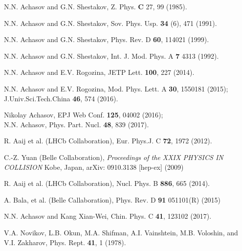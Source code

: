 \documentclass[aps,preprint,groupedaddress,floatfix]{revtex4}
\begin{document}
\begin{thebibliography}{99}
 N.N. Achasov and G.N. Shestakov,  Z. Phys. {\bf C} 27, 99 (1985).

 N.N. Achasov and G.N. Shestakov,  Sov. Phys. Usp. {\bf 34} (6), 471  (1991).

 N.N. Achasov and G.N. Shestakov, Phys. Rev. D {\bf 60}, 114021
 (1999).

N.N. Achasov and G.N. Shestakov, Int. J. Mod. Phys. A {\bf 7} 4313
(1992).

 N.N. Achasov and E.V. Rogozina, JETP Lett. {\bf 100}, 227 (2014).

N.N. Achasov and E.V. Rogozina, Mod. Phys. Lett. A {\bf 30},
1550181 (2015);\\
 J.Univ.Sci.Tech.China {\bf 46}, 574 (2016).

 Nikolay Achasov, EPJ Web Conf. {\bf 125}, 04002 (2016);\\
N.N. Achasov, Phys. Part. Nucl. {\bf 48}, 839 (2017).

R. Aaij et al. (LHCb Collaboration), Eur. Phys.J. C {\bf 72}, 1972
(2012).

 C.-Z. Yuan (Belle Collaboration),  \textit{ Proceedings of the XXIX PHYSICS IN COLLISION}
Kobe, Japan, arXiv: 0910.3138 [hep-ex] (2009)

R. Aaij et al. (LHCb Collaboration), Nucl. Phys. B {\bf 886}, 665
(2014).

 A. Bala, et al. (Belle Callaboration), Phys.
Rev. D  {\bf 91} 051101(R) (2015)

N.N. Achasov and Kang Xian-Wei, Chin. Phys. C {\bf 41}, 123102
(2017).

V.A. Novikov, L.B. Okun, M.A. Shifman, A.I. Vainshtein, M.B.
Voloshin, and\\ V.I. Zakharov, Phys. Rept. {\bf 41}, 1 (1978).

\end{thebibliography}
\end{document}
